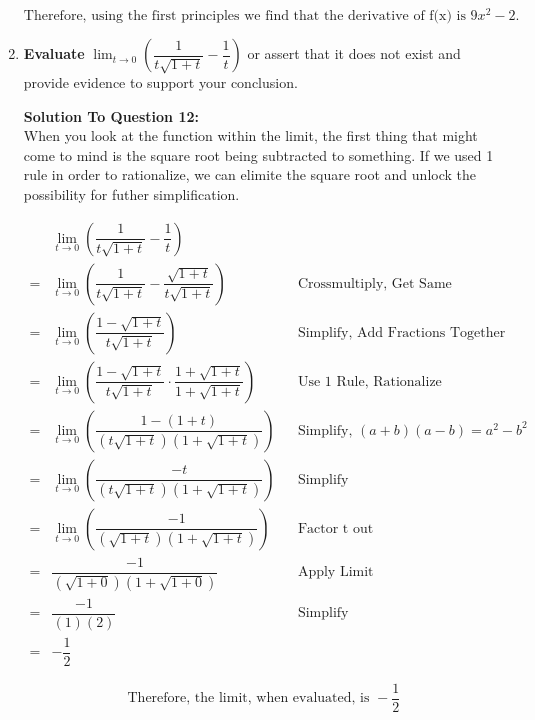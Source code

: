 \documentclass[12pt]{book}
\begin{document}
\begin{enumerate}
$$\boxed{\text{Therefore, using the first principles we find that the derivative of f(x) is } 9x^2 - 2 \text{.}}$$

\vspace{0.3cm}


\newpage


\item \textbf{Evaluate} $\lim_{t\to 0}\limits \left(\dfrac{1}{t\sqrt{1+t}} - \dfrac{1}{t}\right)$ or assert that it does not exist and provide evidence to support your conclusion.

\vspace{0.3cm} 
\textbf{Solution To Question 12:}\\
  When you look at the function within the limit, the first thing that might come to mind 
  is the square root being subtracted to something. If we used 1 rule in order to rationalize, 
  we can elimite the square root and unlock the possibility for futher simplification.
\vspace{0.1cm}

\addtolength{\jot}{0.5em}
\begin{align*}
    & \lim_{t \to 0} \left( \dfrac{1}{t \sqrt{1+t}} - \dfrac{1}{t} \right) && \\
    =& \lim_{t \to 0} \left( \dfrac{1}{t \sqrt{1+t}} - \dfrac{\sqrt{1+t}}{t \sqrt{1+t}} \right) && \text{Crossmultiply, Get Same Denominators} \\
    =& \lim_{t \to 0} \left( \dfrac{1-\sqrt{1+t}}{t \sqrt{1+t}} \right) && \text{Simplify, Add Fractions Together} \\
    =& \lim_{t \to 0} \left( \dfrac{1-\sqrt{1+t}}{t \sqrt{1+t}} \cdot \dfrac{1+\sqrt{1+t}}{1+\sqrt{1+t}} \right) && \text{Use 1 Rule, Rationalize} \\
    =& \lim_{t \to 0} \left( \dfrac{1-(1+t)}{(t \sqrt{1+t})(1+\sqrt{1+t})} \right) && \text{Simplify, } (a+b)(a-b) = a^2-b^2 \\
    =& \lim_{t \to 0} \left( \dfrac{-t}{(t \sqrt{1+t})(1+\sqrt{1+t})} \right) && \text{Simplify} \\
    =& \lim_{t \to 0} \left( \dfrac{-1}{(\sqrt{1+t})(1+\sqrt{1+t})} \right) && \text{Factor t out} \\
    =& \dfrac{-1}{(\sqrt{1+0})(1+\sqrt{1+0})} && \text{Apply Limit} \\
    =& \dfrac{-1}{(1)(2)} && \text{Simplify} \\
    =& -\dfrac{1}{2}
\end{align*}

$$\boxed{\text{Therefore, the limit, when evaluated, is } -\dfrac{1}{2}}$$


\end{enumerate}
\end{document}

